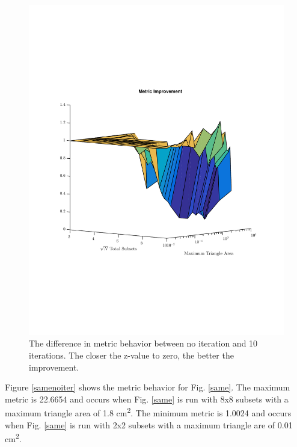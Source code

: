 \documentclass{anstrans}
\begin{document}
\begin{figure}
\centering
\includegraphics[scale=0.5, trim = 0cm 5cm 0cm 5cm,clip]{figures/OppDiff.pdf}
\caption{The difference in metric behavior between no iteration and 10 iterations. The closer the z-value to zero, the better the improvement.}
\label{oppdiff}
\end{figure}

Figure \ref{samenoiter} shows the metric behavior for Fig. \ref{same}. The maximum metric is 22.6654 and occurs when Fig. \ref{same} is run with 8x8 subsets with a maximum triangle area of 1.8 cm\textsuperscript{2}. The minimum metric is 1.0024 and occurs when Fig. \ref{same} is run with 2x2 subsets with a maximum triangle are of 0.01 cm\textsuperscript{2}.
\end{document}
